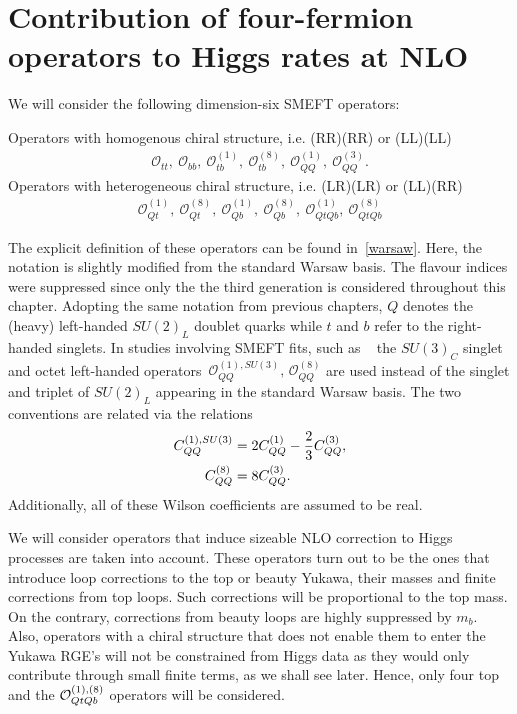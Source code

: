 \section{Contribution of four-fermion operators to Higgs rates at NLO \label{sec:HiggsCalc}}
We will consider the following dimension-six SMEFT operators:
%
\begin{tcolorbox}[title=Four-Heavy-quark SMEFT operators modifying Higgs rates at NLO,
	title filled=false,
	colback=Mahogany!5!white,
	colframe=Mahogany ]
	Operators with homogenous chiral structure, i.e.  (RR)(RR) or (LL)(LL)
	\begin{align}
		\mathcal{O}_{tt},\  \mathcal{O}_{bb},\ \mathcal{O}_{tb}^{(1)}, \ \mathcal{O}_{tb}^{(8)}, \  \mathcal{O}_{QQ}^{(1)},\   \mathcal{O}_{QQ}^{(3)}.
		\label{box:heavyq}
	\end{align}
	Operators with heterogeneous chiral structure, i.e.  (LR)(LR) or (LL)(RR)
	\begin{align}
		\mathcal{O}_{Qt}^{(1)},\ \mathcal{O}_{Qt}^{(8)},\ \mathcal{O}_{Qb}^{(1)},\ \mathcal{O}_{Qb}^{(8)},\ \mathcal{O}^{(1)}_{QtQb},\ \mathcal{O}^{(8)}_{QtQb}
		\label{box:heavyqs}
	\end{align}
\end{tcolorbox}
The explicit definition of these operators can be found in~\autoref{warsaw}. Here, the notation is slightly modified from the standard Warsaw basis. The flavour indices were suppressed since only the the third generation is considered throughout this chapter. Adopting the same notation from previous chapters, $Q$ denotes the (heavy) left-handed  $SU(2)_L$ doublet quarks while  $t$ and $b$ refer to the right-handed singlets.  In studies involving SMEFT fits, such as ~\cite{Ethier:2021bye} the $SU(3)_C$ singlet and octet left-handed operators~$\mathcal{O}_{QQ}^{(1),SU(3)},\,\mathcal{O}_{QQ}^{(8)}$ are used instead of the singlet and triplet of $SU(2)_L$ appearing in the standard Warsaw basis. The two conventions are related via the relations
\begin{align}
	C_{QQ}^{(1),SU(3)} &= 2 C_{QQ}^{(1)} -\frac{2}{3} C_{QQ}^{(3)}, \nonumber \\
	C_{QQ}^{(8)} &= 8 C_{QQ}^{(3)}.
\end{align}
Additionally, all of these Wilson coefficients are assumed to be real.\\
\par  We will consider operators that induce sizeable NLO correction to Higgs processes are taken into account. These operators turn out to be the ones that introduce loop corrections to the top or beauty Yukawa, their masses and finite corrections from top loops. Such corrections will be proportional to the top mass. On the contrary, corrections from beauty loops are highly suppressed by $m_b$. Also, operators with a chiral structure that does not enable them to enter the Yukawa RGE's will not be constrained from Higgs data as they would only contribute through small finite terms, as we shall see later.  Hence, only four top and the  ${\cal O}_{QtQb}^{(1),(8)}$ operators will be considered.

